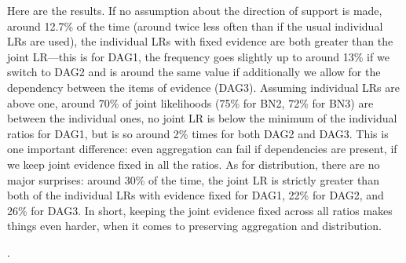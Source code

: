 \documentclass[
  10pt,
  dvipsnames,enabledeprecatedfontcommands]{scrartcl}
\begin{document}
Here are the results. If no assumption about the direction of support is
made, around 12.7\% of the time (around twice less often than if the
usual individual LRs are used), the individual LRs with fixed evidence
are both greater than the joint LR---this is for \textsf{DAG1}, the
frequency goes slightly up to around 13\% if we switch to \textsf{DAG2}
and is around the same value if additionally we allow for the dependency
between the items of evidence (\textsf{DAG3}). Assuming individual LRs
are above one, around 70\% of joint likelihoods (75\% for BN2, 72\% for
BN3) are between the individual ones, no joint LR is below the minimum
of the individual ratios for \textsf{DAG1}, but is so around 2\% times
for both \textsf{DAG2} and \textsf{DAG3}. This is one important
difference: even aggregation can fail if dependencies are present, if we
keep joint evidence fixed in all the ratios. As for distribution, there
are no major surprises: around 30\% of the time, the joint LR is
strictly greater than both of the individual LRs with evidence fixed for
\textsf{DAG1}, 22\% for \textsf{DAG2}, and 26\% for \textsf{DAG3}. In
short, keeping the joint evidence fixed across all ratios makes things
even harder, when it comes to preserving aggregation and distribution.

.
\end{document}
